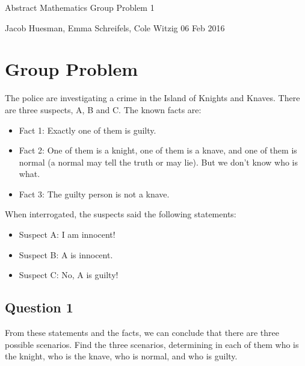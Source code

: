 \documentclass{article}
\begin{document}
	
	
	
	\centerline{\sc \large Abstract Mathematics Group Problem 1}
	\vspace{.5pc}
	\centerline{\sc Jacob Huesman, Emma Schreifels, Cole Witzig 06 Feb 2016}
	
	\vspace{2pc}
	
\section{Group Problem}
The police are investigating a crime in the Island of Knights and Knaves. There are three suspects, A, B and C. The known facts are:

\begin{itemize}[noitemsep, nolistsep]
	\item Fact 1: Exactly one of them is guilty.
	\item Fact 2: One of them is a knight, one of them is a knave, and one of them is normal (a normal may tell the truth or may lie). But we don't know who is what.
	\item Fact 3: The guilty person is not a knave.
\end{itemize}

When interrogated, the suspects said the following statements:
\begin{itemize}[noitemsep, nolistsep]
	\item Suspect A: I am innocent!
	\item Suspect B: A is innocent.
	\item Suspect C: No, A is guilty!
\end{itemize}
	
\subsection{Question 1} 
From these statements and the facts, we can conclude that there are three possible scenarios. Find the three scenarios, determining in each of them who is the knight, who is the knave, who is normal, and who is guilty.
\end{document}
